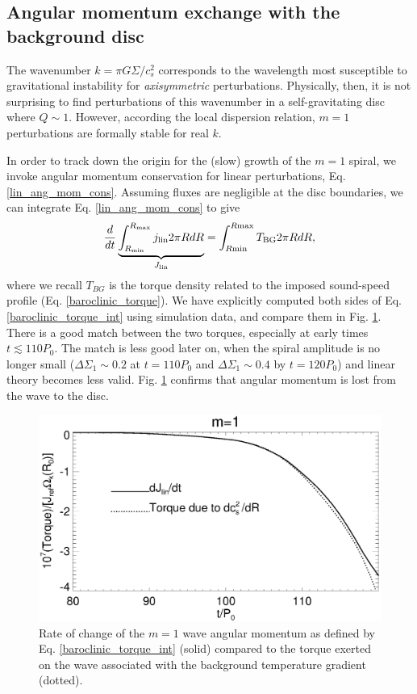 \subsection{Angular momentum exchange with the background disc} 
The wavenumber $k = \pi G\Sigma/c_s^2$ corresponds to the
wavelength most susceptible to gravitational instability for
\emph{axisymmetric} perturbations. Physically, then, it is not
surprising to find perturbations of this wavenumber in a
self-gravitating disc where $Q\sim 1$. However, according the
local dispersion relation, $m=1$ perturbations are formally stable for 
real $k$.  

In order to track down the origin for the (slow) growth of the
$m=1$ spiral, we invoke angular momentum conservation for linear
perturbations, Eq. \ref{lin_ang_mom_cons}. Assuming fluxes are
negligible at the disc boundaries, we can integrate
Eq. \ref{lin_ang_mom_cons} to give
\begin{align}\label{baroclinic_torque_int}
  \frac{d}{dt}\underbrace{\int_{R_\mathrm{min}}^{R_\mathrm{max}}j_\mathrm{lin}
    2\pi R dR}_{J_\mathrm{lin}} 
  =\int_{R\mathrm{min}}^{R\mathrm{max}}T_\mathrm{BG} 2\pi R dR, 
\end{align}
where we recall $T_{BG}$ is the torque density related to the imposed
sound-speed profile (Eq. \ref{baroclinic_torque}). We have explicitly
computed both sides of Eq. \ref{baroclinic_torque_int} using
simulation data, and compare them in Fig. \ref{fargo_angmom_ex}. There
is a good match between the two torques, especially at early times
$t\lesssim110P_0$. The match is less good later on, when the spiral
amplitude is no longer small ($\Delta\Sigma_1\sim 0.2$ at $t=110P_0$
and $\Delta\Sigma_1\sim 0.4$ by $t=120P_0$) and linear theory becomes
less valid. Fig. \ref{fargo_angmom_ex} confirms that angular momentum
is lost from the wave to the disc. 


\begin{figure}
  \includegraphics[width=\linewidth]{figures/m1_analysis_ang_fargo.ps} 
  \caption{Rate of change of the $m=1$ wave angular momentum as defined by
    Eq. \ref{baroclinic_torque_int} (solid) compared to the torque
    exerted on the wave associated with the background temperature
    gradient (dotted). 
    \label{fargo_angmom_ex}} 
\end{figure}

